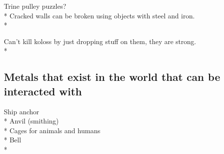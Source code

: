 \documentclass{article}
\begin{document}
Trine pulley puzzles?\\*
Cracked walls can be broken using objects with steel and iron.\\*

Can’t kill koloss by just dropping stuff on them, they are strong.\\* 

\subsection{Metals that exist in the world that can be interacted with}
Ship anchor\\*
Anvil (smithing)\\*
Cages for animals and humans\\*
Bell\\* 
\end{document}
